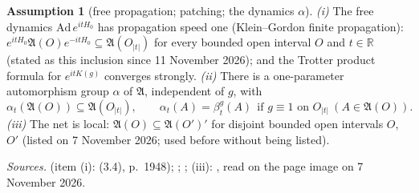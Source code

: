 \documentclass[11pt,a4paper]{article}
\theoremstyle{plain}
\theoremstyle{definition}
\newtheorem{assumption}{Assumption}
\theoremstyle{plain}
\theoremstyle{definition}
\newcommand{\R}{\mathbb{R}}
\newcommand{\A}{\mathfrak{A}}
\begin{document}
\begin{assumption}[free propagation; patching; the dynamics $\alpha$]\label{A:patch}
\emph{(i)} The free dynamics $\mathrm{Ad}\,e^{itH_0}$ has propagation speed one
(Klein--Gordon finite propagation): $e^{itH_0}\A(O)e^{-itH_0}\subseteq\A(O_{|t|})$ for every
bounded open interval $O$ and $t\in\R$ (stated as this inclusion since 11 November 2026); and
the Trotter product formula for $e^{itK(g)}$ converges strongly.
\emph{(ii)} There is a one-parameter automorphism group $\alpha$ of $\A$, independent of $g$,
with
\begin{equation}
 \alpha_t(\A(O))\subseteq\A(O_{|t|}),\qquad
 \alpha_t(A)=\beta^g_t(A)\ \ \text{if } g\equiv1 \text{ on } O_{|t|}\ (A\in\A(O)).
 \tag{P}\label{eq:P}
\end{equation}
\emph{(iii)} The net is local: $\A(O)\subseteq\A(O')'$ for disjoint bounded open intervals
$O$, $O'$ (listed on 7 November 2026; used before without being listed).

\emph{Sources.} \cite[\S III]{GJ1} (item (i): (3.4), p.~1948); \cite[\S\S3.5--3.6]{GJ2};
\cite[\S4.1 and Ch.~4]{GJExp};
(iii): \cite[p.~397, proof of Thm.~3.5.1]{GJ2}, read on the page image on 7 November 2026.


\end{assumption}
\end{document}
